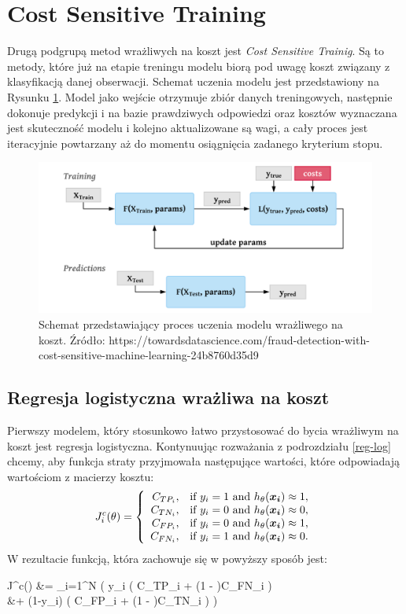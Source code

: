 \documentclass{book}
\begin{document}
\section{Cost Sensitive Training}
	Drugą podgrupą metod wrażliwych na koszt jest \textit{Cost Sensitive Trainig}. Są to metody, które już na etapie treningu modelu biorą pod uwagę koszt związany z klasyfikacją danej obserwacji. Schemat uczenia modelu jest przedstawiony na Rysunku \ref{cst}. Model jako wejście otrzymuje zbiór danych treningowych, następnie dokonuje predykcji i na bazie prawdziwych odpowiedzi oraz kosztów wyznaczana jest skuteczność modelu i kolejno aktualizowane są wagi, a cały proces jest iteracyjnie powtarzany aż do momentu osiągnięcia zadanego kryterium stopu.
	\begin{figure}
		\includegraphics[width=\linewidth]{images/cost_sensitive_training.png}
		\caption{Schemat przedstawiający proces uczenia modelu wrażliwego na koszt. Źródło: https://towardsdatascience.com/fraud-detection-with-cost-sensitive-machine-learning-24b8760d35d9}
		\label{cst}
	\end{figure}	

\subsection{Regresja logistyczna wrażliwa na koszt}
		Pierwszy modelem, który stosunkowo łatwo przystosować do bycia wrażliwym na koszt jest regresja logistyczna. Kontynuując rozważania z podrozdziału \ref{reg-log} chcemy, aby funkcja straty przyjmowała następujące wartości, które odpowiadają wartościom z macierzy kosztu:
		$$
		J^c_i(\theta)=\left\{
		\begin{array}{rl}
		C_{TP_i}, &\mbox{if $y_i = 1$ and $h_{\theta}(\boldsymbol{x_i}) \approx 1$}, \\
		C_{TN_i}, &\mbox{if $y_i = 0$ and $h_{\theta}(\boldsymbol{x_i}) \approx 0$}, \\
		C_{FP_i}, &\mbox{if $y_i = 0$ and $h_{\theta}(\boldsymbol{x_i}) \approx 1$}, \\
		C_{FN_i}, &\mbox{if $y_i = 1$ and $h_{\theta}(\boldsymbol{x_i}) \approx 0$}.
		\end{array}
		\right.
		$$
		W rezultacie funkcją, która zachowuje się w powyższy sposób jest:
		\begin{talign*}
			J^c(\theta) &=  \sum_{i=1}^{N} \bigg( y_i \Big( \htx C_{TP_i} + (1 - \htx)C_{FN_i} \Big) \\
			&+ (1-y_i) \Big( \htx C_{FP_i} + (1 - \htx)C_{TN_i} \Big) \bigg)
		\end{talign*}
		
\end{document}
